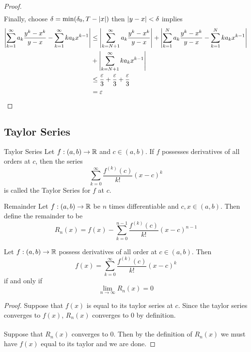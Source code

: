 \documentclass[a4paper]{article}
\begin{document}
\begin{thm}{}{}
\begin{proof}
\begin{align*}
\end{align*}
Finally, choose $\delta=\min(\delta_0,T-\abs{x})$ then $\abs{y-x}<\delta$ implies
\begin{align*}
\abs{\sum_{k=1}^\infty a_k\frac{y^k-x^k}{y-x}-\sum_{k=1}^\infty ka_kx^{k-1}}&\leq\abs{\sum_{k=N+1}^\infty a_k\frac{y^k-x^k}{y-x}}+\abs{\sum_{k=1}^N a_k\frac{y^k-x^k}{y-x}-\sum_{k=1}^N ka_kx^{k-1}}\\
&+\abs{\sum_{k=N+1}^\infty ka_kx^{k-1}}\\
&\leq\frac{\varepsilon}{3}+\frac{\varepsilon}{3}+\frac{\varepsilon}{3}\\
&=\varepsilon
\end{align*}
\end{proof}
\end{thm}

\subsection{Taylor Series}
\begin{defn}{Taylor Series}{} Let $f:(a,b)\to\mathbb{R}$ and $c\in(a,b)$. If $f$ possesses derivatives of all orders at $c$, then the series $$\sum_{k=0}^{\infty}\frac{f^{(k)}(c)}{k!}(x-c)^k$$ is called the Taylor Series for $f$ at $c$. 
\end{defn}

\begin{defn}{Remainder}{} Let $f:(a,b)\to\mathbb{R}$ be $n$ times differentiable and $c,x\in(a,b)$. Then define the remainder to be $$R_n(x)=f(x)-\sum_{k=0}^{n-1}\frac{f^{(k)}(c)}{k!}(x-c)^{n-1}$$
\end{defn}

\begin{thm}{}{} Let $f:(a,b)\to\mathbb{R}$ possess derivatives of all order at $c\in(a,b)$. Then $$f(x)=\sum_{k=0}^{\infty}\frac{f^{(k)}(c)}{k!}(x-c)^k$$ if and only if $$\lim_{n\to\infty}R_n(x)=0$$ \tcbline
\begin{proof}
Suppose that $f(x)$ is equal to its taylor series at $c$. Since the taylor series converges to $f(x)$, $R_n(x)$ converges to $0$ by definition. \\~\\
Suppose that $R_n(x)$ converges to $0$. Then by the definition of $R_n(x)$ we must have $f(x)$ equal to its taylor and we are done. 
\end{proof}
\end{thm}
\end{document}
